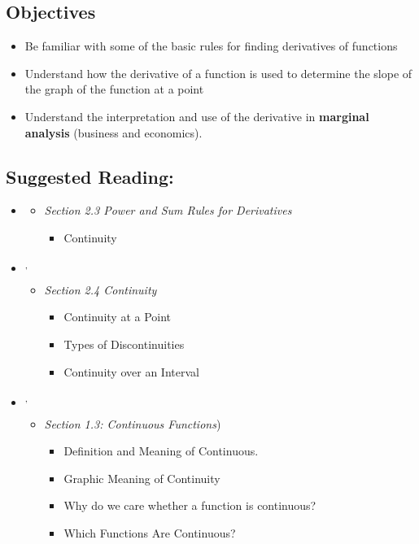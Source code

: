 
\vspace{-0.25 in}
\begin{framed}
\subsection*{Objectives}
\begin{itemize}
    \item Be familiar with some of the basic rules for finding derivatives of functions
    \item Understand how the derivative of a function is used to determine the slope of the graph of the function at a point
    \item Understand the interpretation and use of the derivative in \textbf{marginal analysis} (business and economics).
\end{itemize}

\subsection*{Suggested Reading:}
\begin{itemize}
\item \cite{Calaway}\footnotemark[1]
   \begin{itemize}
        \item \emph{Section 2.3 Power and Sum Rules for Derivatives}
        \begin{itemize}
            \item Continuity 
        \end{itemize}
    \end{itemize}

\item \cite{openstax}\footnotemark[2]\textsuperscript{,}\footnotemark[3]
    \begin{itemize}
        \item \emph{Section 2.4 Continuity}
        \begin{itemize}
            \item Continuity at a Point
            \item Types of Discontinuities
            \item Continuity over an Interval
        \end{itemize}
    \end{itemize}
\item \cite{Hoffman}\footnotemark[3]\textsuperscript{,}\footnotemark[4]
    \begin{itemize}
        \item \emph{Section 1.3: Continuous Functions})
        \begin{itemize}
            \item Definition and Meaning of Continuous.
           \item Graphic Meaning of Continuity
            \item Why do we care whether a function is continuous?
            \item Which Functions Are Continuous?
        \end{itemize}
        

\end{itemize}
\end{itemize}
\end{framed}
